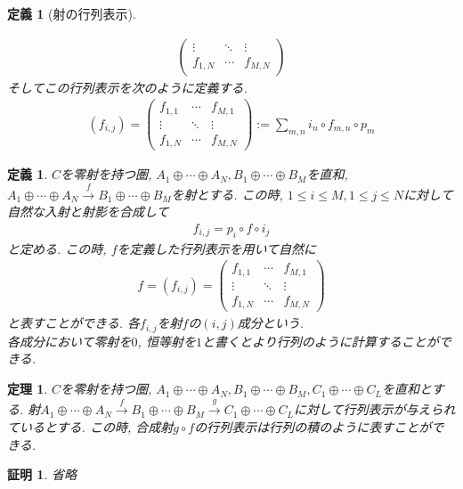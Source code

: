 \documentclass[a4paper,12pt]{ltjsarticle}
\theoremstyle{break}
\newtheorem{defn}[thm]{定義}
\newtheorem{thrm}[thm]{定理}
\newtheorem*{prf}{証明}
\newcommand{\xr}[1]{\xrightarrow{#1}}
\newcommand{\ci}{\circ}
\newcommand{\opl}{\oplus}
\numberwithin{equation}{section}
\begin{document}
\begin{defn}[射の行列表示]
\begin{itemize}
\begin{align*}
\begin{pmatrix}
        \vdots & \ddots & \vdots \\
        f_{1,N} & \cdots  & f_{M,N}
      \end{pmatrix}
    \end{align*}
    そしてこの行列表示を次のように定義する. 
    \begin{align*}
      (f_{i,j}) = 
      \begin{pmatrix}
        f_{1,1} & \cdots & f_{M,1} \\
        \vdots & \ddots & \vdots \\
        f_{1,N} & \cdots  & f_{M,N}
      \end{pmatrix}
      := \sum_{m,n} i_n \ci f_{m,n} \ci p_m
    \end{align*}
  \end{itemize}
\end{defn}

\begin{defn}
  $C$を零射を持つ圏, $A_1 \opl \cdots \opl A_N, B_1 \opl \cdots \opl B_M$を直和, $A_1 \opl \cdots \opl A_N \xr{f} B_1 \opl \cdots \opl B_M$を射とする. 
  この時, $1 \leq i \leq M, 1 \leq j \leq N$に対して自然な入射と射影を合成して
  \begin{align*}
    f_{i,j}=p_i \ci f \ci i_j
  \end{align*}
  と定める.
  この時, $f$を定義した行列表示を用いて自然に
  \begin{align*}
    f=(f_{i,j})
    =\begin{pmatrix}
      f_{1,1} & \cdots & f_{M,1} \\
      \vdots & \ddots & \vdots \\
      f_{1,N} & \cdots  & f_{M,N}
    \end{pmatrix}
  \end{align*}
  と表すことができる. 
  各$f_{i,j}$を射$f$の$(i,j)$成分という. \\
  各成分において零射を$0$, 恒等射を$1$と書くとより行列のように計算することができる. 
\end{defn}

\begin{thrm}
  $C$を零射を持つ圏, $A_1 \opl \cdots \opl A_N, B_1 \opl \cdots \opl B_M, C_1 \opl \cdots \opl C_L$を直和とする. 
  射$A_1 \opl \cdots \opl A_N \xr{f} B_1 \opl \cdots \opl B_M \xr{g} C_1 \opl \cdots \opl C_L$に対して行列表示が与えられているとする. 
  この時, 合成射$g \ci f$の行列表示は行列の積のように表すことができる. 
\end{thrm}

\begin{prf}
  省略
\end{prf}
\end{document}
